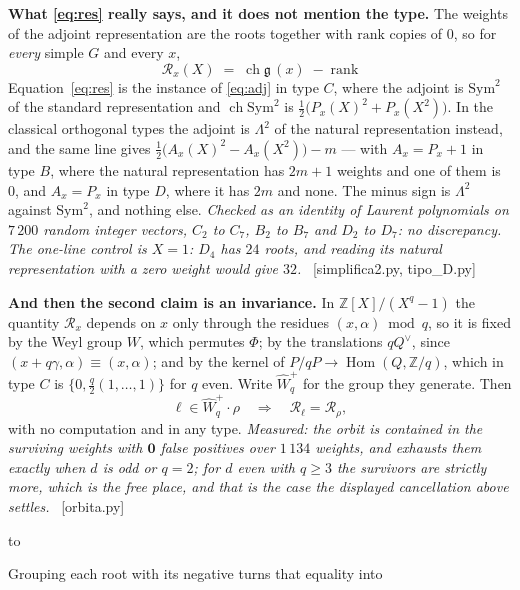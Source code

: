 \documentclass[11pt,a4paper]{article}
\theoremstyle{definition}
\newcommand{\ZZ}{\mathbb{Z}}
\newcommand{\ver}[1]{\unskip\penalty0\ \textcolor{azul}{\small\textsf{[#1]}}}
\newenvironment{keybox}
  {\par\vspace{9pt}\begin{lrbox}{\fichabox}%
   \begin{minipage}{0.90\textwidth}\vspace{7pt}\setlength{\parskip}{3pt}}
  {\vspace{7pt}\end{minipage}\end{lrbox}%
   \par\noindent\hbox to \textwidth{\hfill
   \textcolor{azul}{\rule[-\dp\fichabox]{3.2pt}{\dimexpr\ht\fichabox+\dp\fichabox\relax}}%
   \colorbox{fondoficha}{\usebox{\fichabox}}\hfill}%
   \par\vspace{9pt}}
\begin{document}
\begin{keybox}
\textbf{What \eqref{eq:res} really says, and it does not mention the type.} The weights of the
adjoint representation are the roots together with $\mathrm{rank}$ copies of $0$, so for
\emph{every} simple $G$ and every $x$,
\begin{equation}\label{eq:adj}
\boxed{\;\mathscr{R}_x(X)\;=\;\operatorname{ch}\mathfrak g\,(x)\;-\;\mathrm{rank}\;}
\end{equation}
Equation~\eqref{eq:res} is the instance of \eqref{eq:adj} in type $C$, where the adjoint is
$\mathrm{Sym}^2$ of the standard representation and $\operatorname{ch}\mathrm{Sym}^2$ is
$\tfrac12\bigl(P_x(X)^2+P_x(X^2)\bigr)$. In the classical orthogonal types the adjoint is
$\Lambda^2$ of the natural representation instead, and the same line gives
$\tfrac12\bigl(A_x(X)^2-A_x(X^2)\bigr)-m$ --- with $A_x=P_x+1$ in type $B$, where the natural
representation has $2m+1$ weights and one of them is $0$, and $A_x=P_x$ in type $D$, where it
has $2m$ and none. The minus sign is $\Lambda^2$ against $\mathrm{Sym}^2$, and nothing else.
\emph{Checked as an identity of Laurent polynomials on $7\,200$ random integer vectors, $C_2$
to $C_7$, $B_2$ to $B_7$ and $D_2$ to $D_7$: no discrepancy. The one-line control is $X=1$:
$D_4$ has $24$ roots, and reading its natural representation with a zero weight would give
$32$.} \ver{simplifica2.py, tipo\_D.py}

\smallskip
\textbf{And then the second claim is an invariance.} In $\ZZ[X]/(X^q-1)$ the quantity
$\mathscr{R}_x$ depends on $x$ only through the residues $(x,\alpha)\bmod q$, so it is fixed by the
Weyl group $W$, which permutes $\Phi$; by the translations $q Q^\vee$, since $(x+q\gamma,\alpha)
\equiv(x,\alpha)$; and by the kernel of $P/qP\to\operatorname{Hom}(Q,\ZZ/q)$, which in type $C$ is
$\{0,\tfrac q2(1,\dots,1)\}$ for $q$ even. Write $\widehat W_q^{+}$ for the group they generate.
Then
\[
\ell\in \widehat W_q^{+}\!\cdot\rho \quad\Longrightarrow\quad \mathscr{R}_\ell=\mathscr{R}_\rho ,
\]
with no computation and in any type. \emph{Measured: the orbit is contained in the surviving
weights with $\mathbf{0}$ false positives over $1\,134$ weights, and exhausts them exactly when $d$
is odd or $q=2$; for $d$ even with $q\ge3$ the survivors are strictly more, which is the free place,
and that is the case the displayed cancellation above settles.} \ver{orbita.py}
\end{keybox}

\noindent Grouping each root with its negative turns that equality into
\end{document}
